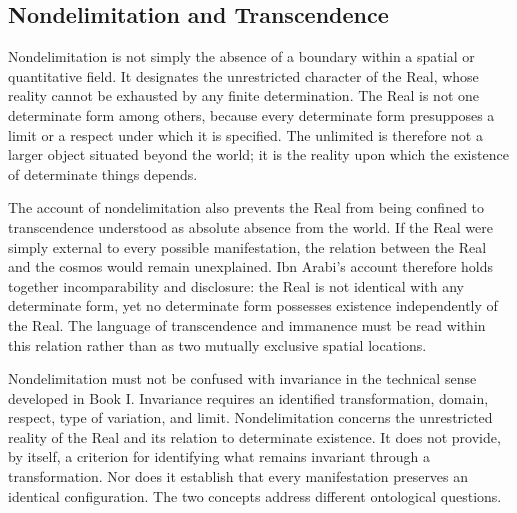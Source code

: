 
\subsection{Nondelimitation and Transcendence}
\label{subsec:ch08_s16_ss05}

\label{para:VS.B01.P01.C08.S16.SS05.P001}

Nondelimitation is not simply the absence of a boundary
within a spatial or quantitative field. It designates
the unrestricted character of the Real, whose reality
cannot be exhausted by any finite determination. The
Real is not one determinate form among others, because
every determinate form presupposes a limit or a respect
under which it is specified. The unlimited is therefore
not a larger object situated beyond the world; it is
the reality upon which the existence of determinate
things depends.

\label{para:VS.B01.P01.C08.SS05.P002}

The account of nondelimitation also prevents the Real
from being confined to transcendence understood as
absolute absence from the world. If the Real were
simply external to every possible manifestation, the
relation between the Real and the cosmos would remain
unexplained. Ibn Arabi's account therefore holds together
incomparability and disclosure: the Real is not identical
with any determinate form, yet no determinate form
possesses existence independently of the Real. The
language of transcendence and immanence must be read
within this relation rather than as two mutually
exclusive spatial locations.

\label{para:VS.B01.P01.C08.SS05.P003}

Nondelimitation must not be confused with invariance
in the technical sense developed in Book I. Invariance
requires an identified transformation, domain, respect,
type of variation, and limit. Nondelimitation concerns
the unrestricted reality of the Real and its relation
to determinate existence. It does not provide, by
itself, a criterion for identifying what remains
invariant through a transformation. Nor does it
establish that every manifestation preserves an
identical configuration. The two concepts address
different ontological questions.



